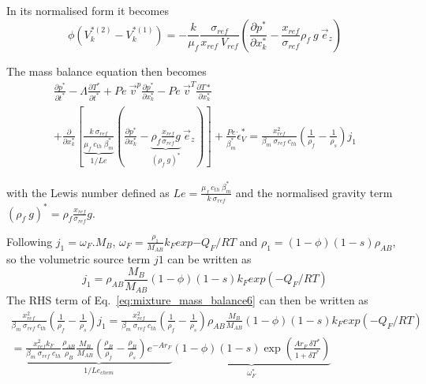 \documentclass[]{scrreprt}
\begin{document}
In its normalised form it becomes 
\begin{equation}
  \label{eq:darcy_normalised}
  \phi(V^{*(2)}_k -V^{*(1)}_k)
  = -\frac{k}{\mu_f} \frac{\sigma_{ref}}{x_{ref}\:V_{ref}}\left(\frac{\partial p^*}{\partial x^*_k} - \frac{x_{ref}}{\sigma_{ref}}\rho_f\:g\:\vec{e}_z \right)
\end{equation}

The mass balance equation then becomes
\begin{multline}
  \label{eq:mixture_mass_balance6}
  \frac{\partial p^*}{\partial t^*} 
  - \Lambda \frac{\partial T^*}{\partial t^*} 
  + Pe \:\vec{v}^p \frac{\partial p^*}{\partial x^*_k} 
  - Pe \:\vec{v}^T \frac{\partial T*}{\partial x^*_k} \\
  + \frac{\partial}{\partial x^*_k} \left[ \underbrace{\frac{k \: \sigma_{ref}}{\mu_f\:c_{th}\:\beta^*_m}}_{1/Le} \left( \frac{\partial p^*}{\partial x^*_k} - \underbrace{\rho_f \frac{x_{ref}}{\sigma_{ref}}g}_{(\rho_f\:g)^*}\: \vec{e}_z  \right) \right]
  + \frac{Pe}{\beta^*_m} \dot{\epsilon}^*_V  
  = \frac{x^2_{ref}}{\beta_m\:\sigma_{ref}\:c_{th}} \left(\frac{1}{\rho_f} - \frac{1}{\rho_s}\right)j_1
\end{multline}

with the Lewis number defined as $Le = \frac{\mu_f\:c_{th}\:\beta^*_m}{k \: \sigma_{ref}}$ and the normalised gravity term $(\rho_f\:g)^*=\rho_f \frac{x_{ref}}{\sigma_{ref}}g$.

Following \citep[][appendix A]{Alevizos2014}
$j_1 = \omega_F.M_B$, $\omega_F=\frac{\rho_1}{M_{AB}}k_F exp{-Q_F/RT}$ and $\rho_1=(1-\phi)(1-s)\rho_{AB}$, so the volumetric source term $j1$ can be written as
\begin{equation}
  \label{eq:j1_a}
  j_1 =\rho_{AB}\frac{M_B}{M_{AB}}(1-\phi)(1-s) k_F exp{(-Q_F/RT)}
\end{equation}
The RHS term of Eq.~\ref{eq:mixture_mass_balance6} can then be written as
\begin{multline}
  \label{eq:mixture_mass_balance_rhs}
  \frac{x^2_{ref}}{\beta_m\:\sigma_{ref}\:c_{th}} \left(\frac{1}{\rho_f} - \frac{1}{\rho_s}\right)j_1 = \frac{x^2_{ref}}{\beta_m\:\sigma_{ref}\:c_{th}} \left(\frac{1}{\rho_f} - \frac{1}{\rho_s}\right)\rho_{AB}\frac{M_B}{M_{AB}}(1-\phi)(1-s) k_F exp{(-Q_F/RT)} \\
  = \underbrace{\frac{x^2_{ref}k_F }{\beta_m\:\sigma_{ref}\:c_{th}} \frac{\rho_{AB}}{\rho_B}\frac{M_B}{M_{AB}}\left(\frac{\rho_B}{\rho_f} - \frac{\rho_B}{\rho_s}\right)e^{-Ar_F}}_{1/Le_{chem}} \underbrace{(1-\phi)(1-s) \exp{\left( \frac{Ar_F \:\delta T^*}{1+\delta T^*} \right)}}_{\omega^*_F }
\end{multline}
\end{document}

